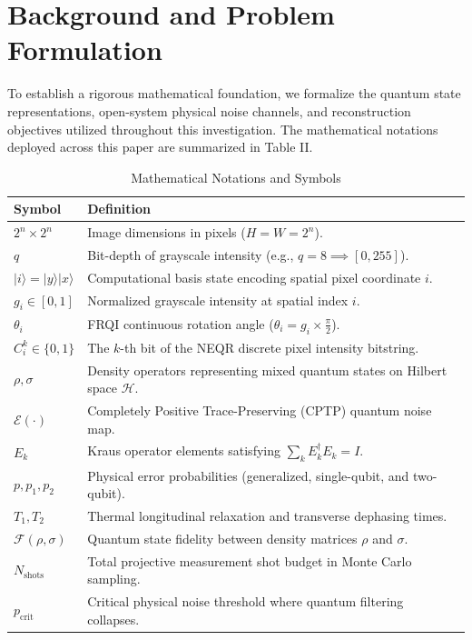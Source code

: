 \documentclass[12pt,onecolumn,draftclsnofoot]{IEEEtran}
\begin{document}
\section{Background and Problem Formulation}
To establish a rigorous mathematical foundation, we formalize the quantum state representations, open-system physical noise channels, and reconstruction objectives utilized throughout this investigation. The mathematical notations deployed across this paper are summarized in Table II.

\begin{table}[htbp]
\centering
\caption{Mathematical Notations and Symbols}
\label{tab:notation}
\begin{tabular}{@{}ll@{}}
\toprule
\textbf{Symbol} & \textbf{Definition} \\ \midrule
$2^n \times 2^n$ & Image dimensions in pixels ($H = W = 2^n$). \\
$q$ & Bit-depth of grayscale intensity (e.g., $q=8 \implies [0, 255]$). \\
$|i\rangle = |y\rangle|x\rangle$ & Computational basis state encoding spatial pixel coordinate $i$. \\
$g_i \in [0, 1]$ & Normalized grayscale intensity at spatial index $i$. \\
$\theta_i$ & FRQI continuous rotation angle ($\theta_i = g_i \times \frac{\pi}{2}$). \\
$C_i^k \in \{0, 1\}$ & The $k$-th bit of the NEQR discrete pixel intensity bitstring. \\
$\rho, \sigma$ & Density operators representing mixed quantum states on Hilbert space $\mathcal{H}$. \\
$\mathcal{E}(\cdot)$ & Completely Positive Trace-Preserving (CPTP) quantum noise map. \\
$E_k$ & Kraus operator elements satisfying $\sum_k E_k^\dagger E_k = I$. \\
$p, p_1, p_2$ & Physical error probabilities (generalized, single-qubit, and two-qubit). \\
$T_1, T_2$ & Thermal longitudinal relaxation and transverse dephasing times. \\
$\mathcal{F}(\rho, \sigma)$ & Quantum state fidelity between density matrices $\rho$ and $\sigma$. \\
$N_{\text{shots}}$ & Total projective measurement shot budget in Monte Carlo sampling. \\
$p_{\text{crit}}$ & Critical physical noise threshold where quantum filtering collapses. \\ \bottomrule
\end{tabular}
\end{table}
\end{document}
